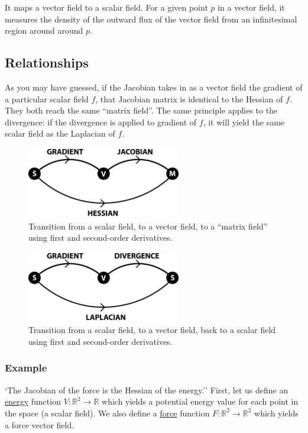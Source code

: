 \documentclass{article}
\begin{document}
It maps a vector field to a scalar field. For a given point $p$ in a vector
field, it measures the density of the outward flux of the vector field from an
infinitesimal region around around $p$.
\subsection{Relationships}
As you may have guessed, if the Jacobian takes in as a vector field the gradient
of a particular scalar field $f$, that Jacobian matrix is identical to the
Hessian of $f$. They both reach the same ``matrix field''. The same principle
applies to the divergence: if the divergence is applied to gradient of $f$, it
will yield the same scalar field as the Laplacian of $f$.
\begin{figure}[H]
  \centering
  \includegraphics[width=0.6\textwidth]{img/hessian.png}
  \caption{Transition from a scalar field, to a vector field, to a ``matrix
  field'' using first and second-order derivatives.}    
\end{figure}

\begin{figure}[H]
  \centering
  \includegraphics[width=0.6\textwidth]{img/laplacian.png}
  \caption{Transition from a scalar field, to a vector field, back to a scalar
  field using first and second-order derivatives.}    
\end{figure}

\subsubsection{Example}
`The Jacobian of the force is the Hessian of the energy.'' First, let us define
an \underline{energy} function $V : \mathbb{R}^2 \rightarrow \mathbb{R}$ which
yields a potential energy value for each point in the space (a scalar field). We
also define a \underline{force} function $F : \mathbb{R}^2 \rightarrow
\mathbb{R}^2$ which yields a force vector field.
\end{document}
